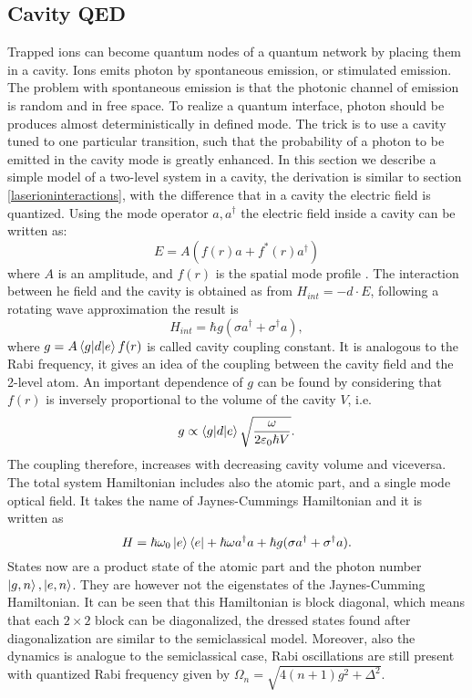 \subsection{Cavity QED}
Trapped ions can become quantum nodes of a quantum network by placing them in a cavity. Ions emits photon by spontaneous emission, or stimulated emission. The problem with spontaneous emission is that the photonic channel of emission is random and in free space. To realize a quantum interface, photon should be produces almost deterministically in defined mode. The trick is to use a cavity tuned to one particular transition, such that the probability of a photon to be emitted in the cavity mode is greatly enhanced. In this section we describe a simple model of a two-level system in a cavity, the derivation is similar to section \ref{laserioninteractions}, with the difference that in a cavity the electric field is quantized. Using the mode operator $a,a^\dagger$ the electric field inside a cavity can be written as:
\begin{equation}
E = A(f(r)a + f^*(r)a^\dagger)
\end{equation}
where $A$ is an amplitude, and $f(r)$ is the spatial mode profile \cite{helene}. The interaction between he field and the cavity is obtained as from $H_{int} = -d\cdot E$, following a rotating wave approximation the result is
\begin{equation}
H_{int} = \hbar g (\sigma a^\dagger + \sigma^\dagger a),
\end{equation}
where $g = A \braket{g|d|e} f(r)$ is called cavity coupling constant. It is analogous to the Rabi frequency, it gives an idea of the coupling between the cavity field and the 2-level atom. An important dependence of $g$ can be found by considering that $f(r)$ is inversely proportional to the volume of the cavity $V$, i.e.
\begin{equation}
g \propto \braket{g|d|e} \sqrt{\frac{\omega}{2\varepsilon_0 \hbar V}}.
\end{equation}
The coupling therefore, increases with decreasing cavity volume and viceversa.\\
The total system Hamiltonian includes also the atomic part, and a single mode optical field. It takes the name of Jaynes-Cummings Hamiltonian and it is written as \cite{qedreview}
\begin{equation}
H = \hbar \omega_0 \ket{e}\bra{e} + \hbar \omega a^\dagger a + \hbar g (\sigma a^\dagger + \sigma^\dagger a).
\end{equation}
States now are a product state of the atomic part and the photon number $\ket{g,n},\ket{e,n}$. They are however not the eigenstates of the Jaynes-Cumming Hamiltonian. It can be seen that this Hamiltonian is block diagonal, which means that each $2\times 2$ block can be diagonalized, the dressed states found after diagonalization are similar to the semiclassical model. Moreover, also the dynamics is analogue to the semiclassical case, Rabi oscillations are still present with quantized Rabi frequency given by $\Omega_n = \sqrt{4(n+1)g^2 +\Delta^2}$.\\
